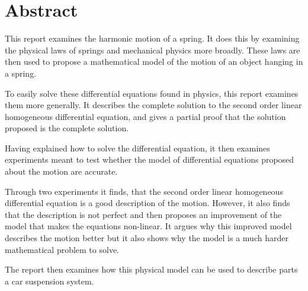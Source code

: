 \section*{Abstract}
This report examines the harmonic motion of a spring. 
It does this by examining the physical laws of springs and mechanical physics more broadly. 
These laws are then used to propose a mathematical model of the motion of an object hanging in a spring.

To easily solve these differential equations found in physics, this report examines them more generally. 
It describes the complete solution to the second order linear homogeneous differential equation, and gives a partial proof that the solution proposed is the complete solution. 

Having explained how to solve the differential equation, it then examines experiments meant to test whether the model of differential equations proposed about the motion are accurate.

Through two experiments it finds, that the second order linear homogeneous differential equation is a good description of the motion.
However, it also finds that the description is not perfect and then proposes an improvement of the model that makes the equations non-linear.
It argues why this improved model describes the motion better but it also shows why the model is a much harder mathematical problem to solve. 

The report then examines how this physical model can be used to describe parts a car suspension system.

